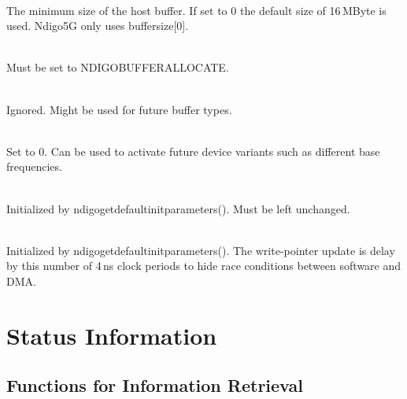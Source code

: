             \\
            The minimum size of the host buffer. If set to 0 the default size of 16\,MByte is used. Ndigo5G only uses \textsf{buffer\tu size[0]}.\par

            \\
            Must be set to \textsf{NDIGO\tu BUFFER\tu ALLOCATE}.\par

            \\
            Ignored. Might be used for future buffer types.\par

            \\
            Set to 0. Can be used to activate future device variants such as different base frequencies.\par

            \\
            Initialized by \textsf{ndigo\tu get\tu default\tu init\tu parameters()}. Must be left unchanged.

            \begin{description}
                \item[] 
                \item[] 
                \item[] 
            \end{description}

            \\
            Initialized by \textsf{ndigo\tu get\tu default\tu init\tu parameters()}. The write-pointer update is delay by this number of 4\,ns clock periods to hide race conditions between software and DMA.\par

    \clearpage
    \section{Status Information}
        \subsection{Functions for Information Retrieval}

